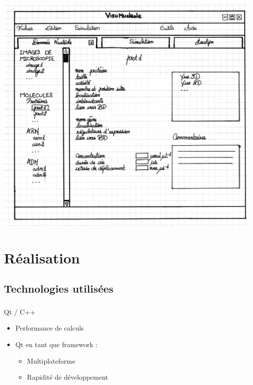 \documentclass{beamer}
\begin{document}
\begin{frame}
  \frametitle{}

  \begin{block}{}
  \begin{center}
    \includegraphics[width=0.7\columnwidth]{img/mock1.png}
  \end{center}
  \end{block}

\end{frame}

\section{Réalisation}

\subsection{Technologies utilisées}

\begin{frame}
  \frametitle{}

  \begin{block}{Qt / C++}
    \begin{itemize}
    \item Performance de calculs
    \item Qt en tant que framework : 
      \begin{itemize}
      \item Multiplateforme
      \item Rapidité de développement
      \end{itemize}
    \end{itemize}
  \end{block}
  
\end{frame}
\end{document}
